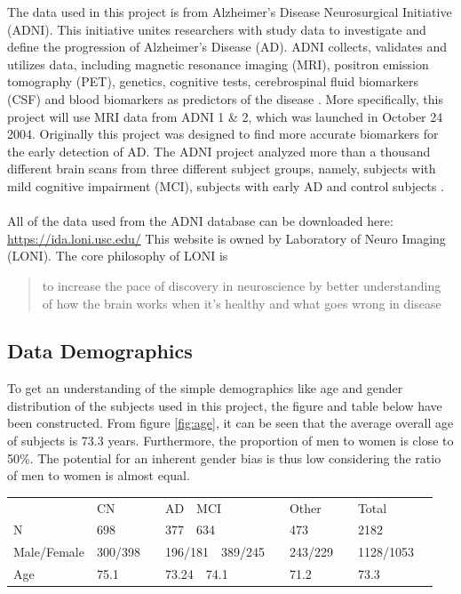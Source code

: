 \documentclass[12pt, fleqn, titlepage]{article}
\begin{document}
The data used in this project is from Alzheimer's Disease Neurosurgical Initiative (ADNI). This initiative unites researchers with study data to investigate and define the progression of Alzheimer's Disease (AD). 
ADNI collects, validates and utilizes data, including magnetic resonance imaging (MRI), positron emission tomography (PET), genetics, cognitive tests, cerebrospinal fluid biomarkers (CSF) and blood biomarkers as predictors of the disease \cite{adni}.
More specifically, this project will use MRI data from ADNI 1 \& 2, which was launched in October 24 2004. Originally this project was designed to find more accurate biomarkers for the early detection of AD.
The ADNI project analyzed more than a thousand different brain scans from three different subject groups, namely, subjects with mild cognitive impairment (MCI), subjects with early AD and control subjects \cite{adni1}. 
\\\\
All of the data used from the ADNI database can be downloaded here: \url{https://ida.loni.usc.edu/} \newline
This website is owned by Laboratory of Neuro Imaging (LONI). The core philosophy of LONI is \blockcquote{loni}{to increase the pace of discovery in neuroscience by better understanding of how the brain works when it’s healthy and what goes wrong in disease}.


\subsection{Data Demographics}
To get an understanding of the simple demographics like age and gender distribution of the subjects used in this project, the figure and table below have been constructed. From figure \ref{fig:age}, it can be seen that the average overall age of subjects is 73.3 years. Furthermore, the proportion of men to women is close to 50\%. The potential for an inherent gender bias is thus low considering the ratio of men to women is almost equal.

\begin{table}[H]
	\begin{tabular}{llllll}
		& CN&\ \ AD\ \ MCI &\ \ Other &\ \ Total   \\
		N & 698&\ \ 377\ \ 634 &\ \ 473 &\ \ 2182   \\
		Male/Female & 300/398&\ \ 196/181\ \ 389/245 &\ \ 243/229  &\ \ 1128/1053   \\
		Age & 75.1&\ \ 73.24\ \ 74.1 &\ \ 71.2 &\ \ 73.3   \\
	\end{tabular}
\end{table}
\end{document}
